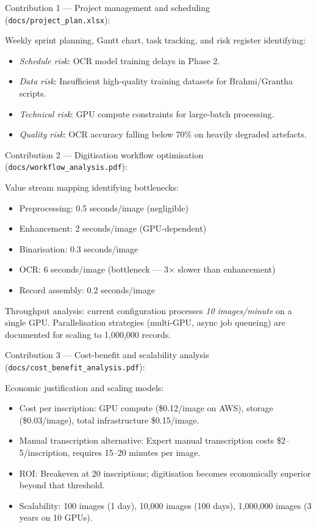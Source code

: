 Contribution 1 — Project management and scheduling (\texttt{docs/project\_plan.xlsx}):

Weekly sprint planning, Gantt chart, task tracking, and risk register identifying:
\begin{itemize}
	\item \textit{Schedule risk}: OCR model training delays in Phase 2.
	\item \textit{Data risk}: Insufficient high-quality training datasets for Brahmi/Grantha scripts.
	\item \textit{Technical risk}: GPU compute constraints for large-batch processing.
	\item \textit{Quality risk}: OCR accuracy falling below 70\% on heavily degraded artefacts.
\end{itemize}

Contribution 2 — Digitisation workflow optimisation (\texttt{docs/workflow\_analysis.pdf}):

Value stream mapping identifying bottlenecks:
\begin{itemize}
	\item Preprocessing: 0.5 seconds/image (negligible)
	\item Enhancement: 2 seconds/image (GPU-dependent)
	\item Binarisation: 0.3 seconds/image
	\item OCR: 6 seconds/image (bottleneck — 3× slower than enhancement)
	\item Record assembly: 0.2 seconds/image
\end{itemize}

Throughput analysis: current configuration processes \textit{10 images/minute} on a single GPU. Parallelisation strategies (multi-GPU, async job queueing) are documented for scaling to 1,000,000 records.

Contribution 3 — Cost-benefit and scalability analysis (\texttt{docs/cost\_benefit\_analysis.pdf}):

Economic justification and scaling models:
\begin{itemize}
	\item Cost per inscription: GPU compute (\$0.12/image on AWS), storage (\$0.03/image), total infrastructure \$0.15/image.
	\item Manual transcription alternative: Expert manual transcription costs \$2–5/inscription, requires 15–20 minutes per image.
	\item ROI: Breakeven at 20 inscriptions; digitisation becomes economically superior beyond that threshold.
	\item Scalability: 100 images (1 day), 10,000 images (100 days), 1,000,000 images (3 years on 10 GPUs).
\end{itemize}

